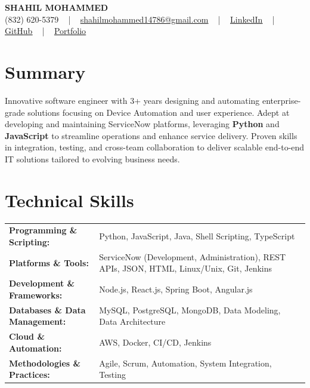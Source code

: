\documentclass[letterpaper,11pt]{article}
\begin{document}
\begin{center}
    {\fontsize{14pt}{12pt}\selectfont \textbf{\MakeUppercase{Shahil Mohammed}}}\\ \vspace{2pt}
    \fontsize{10pt}{12pt}\selectfont (832) 620-5379 ~ | ~ \href{mailto:shahilmohammed14786@gmail.com}{shahilmohammed14786@gmail.com} ~ | ~  
    \href{https://www.linkedin.com/in/shahil-mohammed-9652931a1/}{\color{blue}\underline{LinkedIn}}  ~ | ~ 
    \href{https://github.com/freakbeast14}{\color{blue}\underline{GitHub}} ~ | ~ 
    \href{https://shahil-mohammed.netlify.app/}{\color{blue}\underline{Portfolio}}
    \vspace{-8pt}
\end{center}

\section{Summary}
\fontsize{9pt}{10pt}\selectfont
Innovative software engineer with 3+ years designing and automating enterprise-grade solutions focusing on Device Automation and user experience. Adept at developing and maintaining ServiceNow platforms, leveraging \textbf{Python} and \textbf{JavaScript} to streamline operations and enhance service delivery. Proven skills in integration, testing, and cross-team collaboration to deliver scalable end-to-end IT solutions tailored to evolving business needs.
 \vspace{-5pt}
 
\section{Technical Skills}
        \vspace{-14pt}
        \begin{table}[h]
            \fontsize{9pt}{10pt}\selectfont
            \begin{tabular}{p{0.3\linewidth} p{0.7\linewidth}}
                \textbf{Programming \& Scripting:} & Python, JavaScript, Java, Shell Scripting, TypeScript \\
                \textbf{Platforms \& Tools:} & ServiceNow (Development, Administration), REST APIs, JSON, HTML, Linux/Unix, Git, Jenkins \\
                \textbf{Development \& Frameworks:} & Node.js, React.js, Spring Boot, Angular.js \\
                \textbf{Databases \& Data Management:} & MySQL, PostgreSQL, MongoDB, Data Modeling, Data Architecture \\
                \textbf{Cloud \& Automation:} & AWS, Docker, CI/CD, Jenkins \\
                \textbf{Methodologies \& Practices:} & Agile, Scrum, Automation, System Integration, Testing \\
            \end{tabular}
        \end{table}
 \vspace{-15pt}
 
\end{document}
